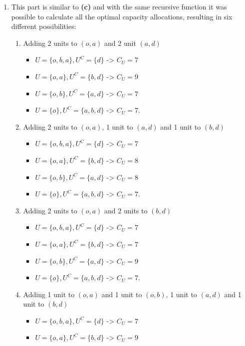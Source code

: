 \documentclass[
	12pt, %
]{fphw}
\begin{document}
\begin{enumerate}[{\bfseries (a)}]
        \item This part is similar to \textbf{(c)} and with the same recursive function it was possible to calculate all the optimal capacity allocations, resulting in six different possibilities:
        \begin{enumerate}[1)]
            \item Adding 2 units to $(o,a)$ and 2 unit $(a,d)$ 
            \begin{itemize}
                \item $U=\{o,b,a\},U^C=\{d\}$ -> $C_U = 7$
                \item $U=\{o,a\},U^C=\{b,d\}$ -> $C_U = 9$
                \item $U=\{o,b\},U^C=\{a,d\}$ -> $C_U = 7$
                \item $U=\{o\},U^C=\{a,b,d\}$ -> $C_U = 7$.
            \end{itemize}
            \item Adding 2 units to $(o,a)$, 1 unit to $(a,d)$ and 1 unit to $(b,d)$ 
            \begin{itemize}
                \item $U=\{o,b,a\},U^C=\{d\}$ -> $C_U = 7$
                \item $U=\{o,a\},U^C=\{b,d\}$ -> $C_U = 8$
                \item $U=\{o,b\},U^C=\{a,d\}$ -> $C_U = 8$
                \item $U=\{o\},U^C=\{a,b,d\}$ -> $C_U = 7$.
            \end{itemize}
            \item Adding 2 units to $(o,a)$ and 2 units to $(b,d)$
            \begin{itemize}
                \item $U=\{o,b,a\},U^C=\{d\}$ -> $C_U = 7$
                \item $U=\{o,a\},U^C=\{b,d\}$ -> $C_U = 7$
                \item $U=\{o,b\},U^C=\{a,d\}$ -> $C_U = 9$
                \item $U=\{o\},U^C=\{a,b,d\}$ -> $C_U = 7$.
            \end{itemize}
            \item Adding 1 unit to $(o,a)$ and 1 unit to $(o,b)$, 1 unit to $(a,d)$ and 1 unit to $(b,d)$
            \begin{itemize}
                \item $U=\{o,b,a\},U^C=\{d\}$ -> $C_U = 7$
                \item $U=\{o,a\},U^C=\{b,d\}$ -> $C_U = 9$

\end{itemize}
\end{enumerate}
\end{enumerate}
\end{document}
